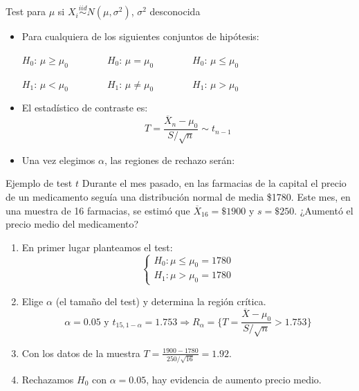 \documentclass{beamer}
\theoremstyle{definition}
\begin{document}
\begin{frame}{\color{rosee}Test para $\mu$ si $X_i\stackrel{iid}{\sim}N(\mu,\sigma^2)$, $\sigma^2$ desconocida}
\begin{itemize}
\item Para cualquiera de los siguientes conjuntos de hipótesis:
	\begin{center}
		$H_{0}$: $\mu \geq \mu _{0}\qquad \qquad H_{0}$: $\mu = \mu _{0}\qquad \qquad	H_{0}$: $\mu \leq \mu _{0}$
		
		$H_{1}$: $\mu < \mu _{0}\qquad \qquad H_{1}$: $\mu \neq \mu _{0}\qquad \qquad
		H_{1}$: $\mu >\mu _{0}$
	\end{center}

	
\item El estadístico de contraste es:
	$$T=\frac{\overline{X}_n-\mu _{0}}{S /\sqrt{n}}\sim t_{n-1}$$

\item Una vez elegimos $\alpha$, las regiones de rechazo serán:	

\begin{center}
\end{center}
	
\end{itemize}
\end{frame}


\begin{frame}{\color{rosee}Ejemplo de test $t$}
\small
Durante el mes pasado, en las farmacias de la capital el precio de un medicamento seguía una distribución normal de media \$1780. Este mes, en una muestra de 16 farmacias, se estimó que $\overline{X}_{16}=\$1900$ y $s=\$250$. ¿Aumentó el precio medio del medicamento?
\begin{enumerate}
\item En primer lugar planteamos el test:
\[
\begin{cases}
		H_{0}: \mu \leq \mu_0=1780\\
		H_{1}:\mu >\mu_0=1780
\end{cases}
\]
\item Elige $\alpha$ (el tamaño del test) y determina la región crítica.\medskip
$$ \alpha= 0.05 \text{ y } t_{15,1-\alpha }=1.753\Rightarrow R_\alpha = \Big\{ T = \frac{\overline{X}-\mu _{0}}{S/\sqrt{n}} > 1.753 \Big\}$$

\item Con los datos de la muestra $T=\frac{1900-1780}{250/\sqrt{16}}=1.92$.\medskip
\item Rechazamos $H_0$ con $\alpha = 0.05$, hay evidencia de aumento precio medio.
\end{enumerate}			
\end{frame}
\end{document}
